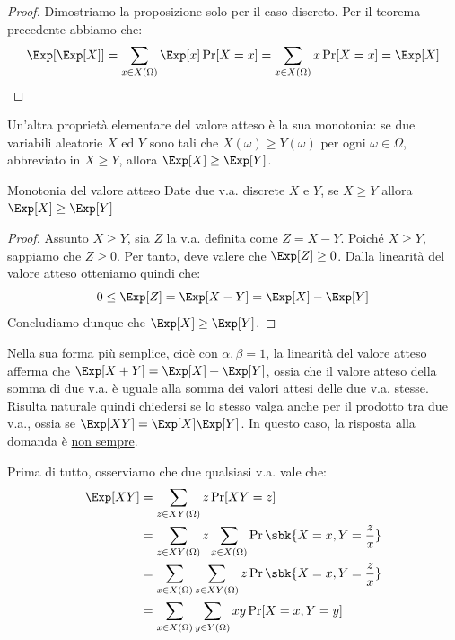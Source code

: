 \documentclass[a4paper, 12pt]{report}
\begin{document}
    \begin{proof}
        Dimostriamo la proposizione solo per il caso discreto. Per il teorema precedente abbiamo che: 
        \[\Exp[\Exp[X]] =  \sum_{x \in X(\Omega)} \Exp[x] \Pr[X = x] = \sum_{x \in X(\Omega)} x \Pr[X = x] = \Exp[X]\]
    \end{proof}

    Un'altra proprietà elementare del valore atteso è la sua monotonia: se due variabili aleatorie $X$ ed $Y$ sono tali che $X(\omega) \geq Y(\omega)$ per ogni $\omega \in \Omega$, abbreviato in $X \geq Y$, allora $\Exp[X] \geq \Exp[Y]$.

    \begin{framedthm}{Monotonia del valore atteso}
        Date due v.a. discrete $X$ e $Y$, se $X \geq Y$ allora $\Exp[X] \geq \Exp[Y]$
    \end{framedthm}

    \begin{proof}
        Assunto $X \geq Y$, sia $Z$ la v.a. definita come $Z = X - Y$. Poiché $X \geq Y$, sappiamo che $Z \geq 0$. Per tanto, deve valere che $\Exp[Z] \geq 0$. Dalla linearità del valore atteso otteniamo quindi che:
        \[0 \leq \Exp[Z] = \Exp[X-Y] = \Exp[X] - \Exp[Y]\]
        Concludiamo dunque che $\Exp[X] \geq \Exp[Y]$. 
    \end{proof}

    Nella sua forma più semplice, cioè con $\alpha, \beta = 1$, la linearità del valore atteso afferma che $\Exp[X + Y] = \Exp[X] + \Exp[Y]$, ossia che il valore atteso della somma di due v.a. è uguale alla somma dei valori attesi delle due v.a. stesse. Risulta naturale quindi chiedersi se lo stesso valga anche per il prodotto tra due v.a., ossia se $\Exp[XY] = \Exp[X] \Exp[Y]$. In questo caso, la risposta alla domanda è \underline{non sempre}.

    Prima di tutto, osserviamo che due qualsiasi v.a. vale che:
    \[\begin{split}
        \Exp[XY] &= \sum_{z \in XY(\Omega)} z \Pr[XY = z] \\
        &= \sum_{z \in XY(\Omega)} z \sum_{x \in X(\Omega)} \Pr\sbk{X = x, Y = \frac{z}{x}} \\
        &= \sum_{x \in X(\Omega)} \sum_{z \in XY(\Omega)} z \Pr\sbk{X = x, Y = \frac{z}{x}} \\
        &= \sum_{x \in X(\Omega)} \sum_{y \in Y(\Omega)} xy \Pr[X = x, Y = y] \\
    \end{split}\]
\end{document}
